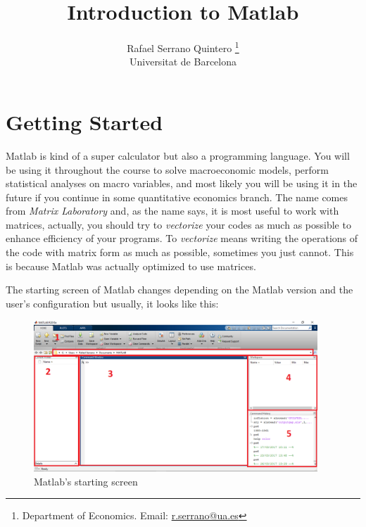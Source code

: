 \documentclass[a4paper,11pt]{article}
\title{\textbf{Introduction to Matlab}}
\author{Rafael Serrano Quintero
\thanks{Department of Economics. Email: \href{mailto:r.serrano@ua.es}{r.serrano@ua.es}} \\
Universitat de Barcelona \\}
\date{}
\begin{document}
\VerbatimFootnotes

\maketitle

\section{Getting Started}

Matlab is kind of a super calculator but also a programming language. You will be using it throughout the course to solve macroeconomic models, perform statistical analyses on macro variables, and most likely you will be using it in the future if you continue in some quantitative economics branch. The name comes from \textit{Matrix Laboratory} and, as the name says, it is most useful to work with matrices, actually, you should try to \textit{vectorize} your codes as much as possible to enhance efficiency of your programs. To \textit{vectorize} means writing the operations of the code with matrix form as much as possible, sometimes you just cannot. This is because Matlab was actually optimized to use matrices.

The starting screen of Matlab changes depending on the Matlab version and the user's configuration but usually, it looks like this:

\begin{figure}[htbp]
\centering
	\includegraphics[width = 0.95\textwidth]{./figures/matlab_initial.png}
	\caption{Matlab's starting screen}
\end{figure}
\end{document}
